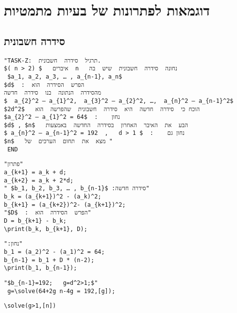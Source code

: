 
\chapter{ דוגמאות לפתרונות של בעיות מתמטיות }

\section{סידרה  חשבונית}
 
\begin{verbatim}
"TASK-Z:  תרגיל  סידרה  חשבונית.
$( n > 2) $   איברים  n   נחונה  סידרה  חשבונית  שיש  בה
 $a_1, a_2, a_3, … , a_{n-1}, a_n$
$d$  :  הפרש  הסידרה  הוא
מהסידרה  הנתונה  בנו  סידרה  חדשה
$  a_{2}^2 – a_{1}^2,  a_{3}^2 – a_{2}^2, …,  a_{n}^2 – a_{n-1}^2$
$2d^2$   הוכח כי  סידרה  חדשה  היא  סידרה  חשבונית  שהפרשה  הוא
$a_{2}^2 – a_{1}^2 = 64$  :    נחון   
$d$ , $n$   הבע  את  האיבר  האחרון  בסידרה  החדשה  באמצעות 
$ a_{n}^2 – a_{n-1}^2 = 192  ,   d > 1 $  :    נחון גם
$n$   מצא  את  תחום  הערכים  של "
 END
\end{verbatim}

\vspace*{-3mm}  

\begin{verbatim}
"פתרון"
a_{k+1} = a_k + d;
a_{k+2} = a_k + 2*d;
" $b_1, b_2, b_3, … , b_{n-1}$ :סידרה חדשה"
b_k = (a_{k+1})^2 - (a_k)^2;
b_{k+1} = (a_{k+2})^2- (a_{k+1})^2;
"$D$  :  הפרש  הסידרה  הוא"
D = b_{k+1} - b_k;
\print(b_k, b_{k+1}, D);
\end{verbatim}

\vspace*{-3mm} 


\begin{verbatim}
":נחון"
b_1 = (a_2)^2 - (a_1)^2 = 64;
b_{n-1} = b_1 + D * (n-2);
\print(b_1, b_{n-1});
\end{verbatim}

\vspace*{-3mm} 

\begin{verbatim}
"$b_{n-1}=192;   g=d^2>1;$" 
 g=\solve(64+2g n-4g = 192,[g]);
\end{verbatim}

\vspace*{-3mm} 

\begin{verbatim}
\solve(g>1,[n])
\end{verbatim}

\vspace*{-3mm} 

